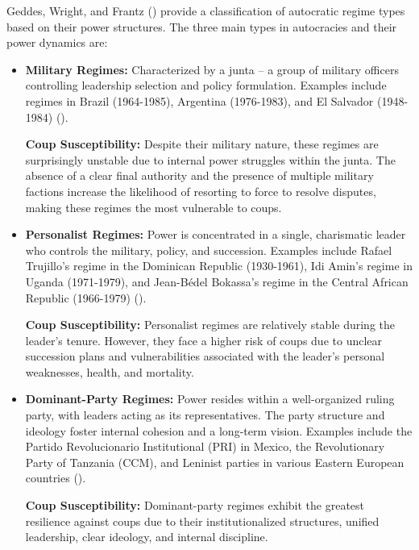 \documentclass[
  12pt,
]{report}
\begin{document}
Geddes, Wright, and Frantz () provide a
classification of autocratic regime types based on their power
structures. The three main types in autocracies and their power dynamics
are:

\begin{itemize}
\item
  \textbf{Military Regimes:} Characterized by a junta -- a group of
  military officers controlling leadership selection and policy
  formulation. Examples include regimes in Brazil (1964-1985), Argentina
  (1976-1983), and El Salvador (1948-1984)
  ().

  \textbf{Coup Susceptibility:} Despite their military nature, these
  regimes are surprisingly unstable due to internal power struggles
  within the junta. The absence of a clear final authority and the
  presence of multiple military factions increase the likelihood of
  resorting to force to resolve disputes, making these regimes the most
  vulnerable to coups.
\item
  \textbf{Personalist Regimes:} Power is concentrated in a single,
  charismatic leader who controls the military, policy, and succession.
  Examples include Rafael Trujillo's regime in the Dominican Republic
  (1930-1961), Idi Amin's regime in Uganda (1971-1979), and Jean-Bédel
  Bokassa's regime in the Central African Republic (1966-1979)
  ().

  \textbf{Coup Susceptibility:} Personalist regimes are relatively
  stable during the leader's tenure. However, they face a higher risk of
  coups due to unclear succession plans and vulnerabilities associated
  with the leader's personal weaknesses, health, and mortality.
\item
  \textbf{Dominant-Party Regimes:} Power resides within a well-organized
  ruling party, with leaders acting as its representatives. The party
  structure and ideology foster internal cohesion and a long-term
  vision. Examples include the Partido Revolucionario Institutional
  (PRI) in Mexico, the Revolutionary Party of Tanzania (CCM), and
  Leninist parties in various Eastern European countries
  ().

  \textbf{Coup Susceptibility:} Dominant-party regimes exhibit the
  greatest resilience against coups due to their institutionalized
  structures, unified leadership, clear ideology, and internal
  discipline.
\end{itemize}
\end{document}
